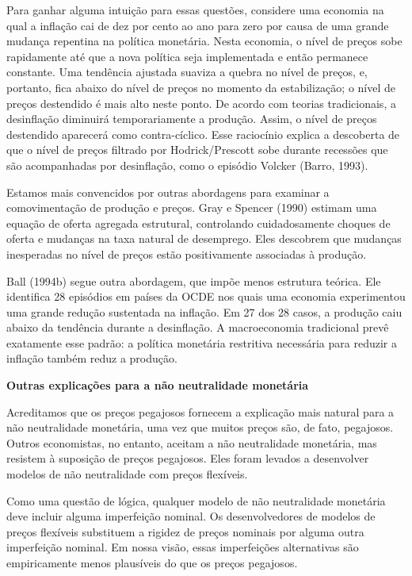 \documentclass[a4paper,12pt]{article}[abntex2]
\begin{document}
Para ganhar alguma intuição para essas questões, considere uma economia na qual a inflação cai de dez por cento ao ano para zero por causa de uma grande mudança repentina na política monetária. Nesta economia, o nível de preços sobe rapidamente até que a nova política seja implementada e então permanece constante. Uma tendência ajustada suaviza a quebra no nível de preços, e, portanto, fica abaixo do nível de preços no momento da estabilização; o nível de preços destendido é mais alto neste ponto. De acordo com teorias tradicionais, a desinflação diminuirá temporariamente a produção. Assim, o nível de preços destendido aparecerá como contra-cíclico. Esse raciocínio explica a descoberta de que o nível de preços filtrado por Hodrick/Prescott sobe durante recessões que são acompanhadas por desinflação, como o episódio Volcker (Barro, 1993).

Estamos mais convencidos por outras abordagens para examinar a comovimentação de produção e preços. Gray e Spencer (1990) estimam uma equação de oferta agregada estrutural, controlando cuidadosamente choques de oferta e mudanças na taxa natural de desemprego. Eles descobrem que mudanças inesperadas no nível de preços estão positivamente associadas à produção.

Ball (1994b) segue outra abordagem, que impõe menos estrutura teórica. Ele identifica 28 episódios em países da OCDE nos quais uma economia experimentou uma grande redução sustentada na inflação. Em 27 dos 28 casos, a produção caiu abaixo da tendência durante a desinflação. A macroeconomia tradicional prevê exatamente esse padrão: a política monetária restritiva necessária para reduzir a inflação também reduz a produção.

\textbf{Outras explicações para a não neutralidade monetária}

Acreditamos que os preços pegajosos fornecem a explicação mais natural para a não neutralidade monetária, uma vez que muitos preços são, de fato, pegajosos. Outros economistas, no entanto, aceitam a não neutralidade monetária, mas resistem à suposição de preços pegajosos. Eles foram levados a desenvolver modelos de não neutralidade com preços flexíveis.

Como uma questão de lógica, qualquer modelo de não neutralidade monetária deve incluir alguma imperfeição nominal. Os desenvolvedores de modelos de preços flexíveis substituem a rigidez de preços nominais por alguma outra imperfeição nominal. Em nossa visão, essas imperfeições alternativas são empiricamente menos plausíveis do que os preços pegajosos.
\end{document}
